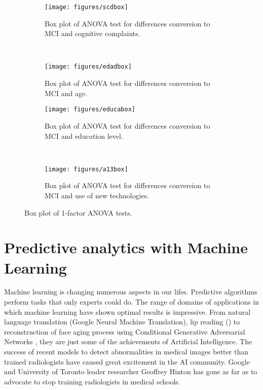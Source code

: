 \documentclass[11pt]{article}
\begin{document}
\begin{figure}[H]
    \centering
    \begin{subfigure}[t]{0.45\textwidth}
        \centering
        \texttt{[image: figures/scdbox]}
        \caption{Box plot of ANOVA test for differences conversion to MCI and cognitive complaints.}
    \end{subfigure}
    ~ 
    \begin{subfigure}[t]{0.45\textwidth}
        \centering
        \texttt{[image: figures/edadbox]}
        \caption{Box plot of ANOVA test for differences conversion to MCI and age.}
    \end{subfigure}%
    
     \begin{subfigure}[t]{0.45\textwidth}
        \centering
        \texttt{[image: figures/educabox]}
        \caption{Box plot of ANOVA test for differences conversion to MCI and education level.}
    \end{subfigure}
    ~ 
    \begin{subfigure}[t]{0.45\textwidth}
        \centering
        \texttt{[image: figures/a13box]}
        \caption{Box plot of ANOVA test for differences conversion to MCI and use of new technologies.}
    \end{subfigure}%
    \label{fig:anovabox}
    \caption{Box plot of 1-factor ANOVA tests.}
\end{figure}

\newpage
\section{Predictive analytics with Machine Learning} 
\label{se:mod}

Machine learning is changing numerous aspects in our lifes. Predictive algorithms perform tasks that only experts could do. The range of domains of applications in which machine learning have shown optimal results is impressive. From natural language translation (Google Neural Machine Translation), lip reading (\cite{suwajanakorn2017synthesizing}) to reconstruction of face aging process using Conditional Generative Adversarial Networks \cite{antipov2017face}, they are just some of the achievements of Artificial Intelligence.
The success of recent models to detect abnormalities in medical images better than trained radiologists have caused  great excitement in the AI community. Google and University of Toronto leader researcher Geoffrey Hinton has gone as far as to advocate to stop training radiologists in medical schools.
\end{document}
